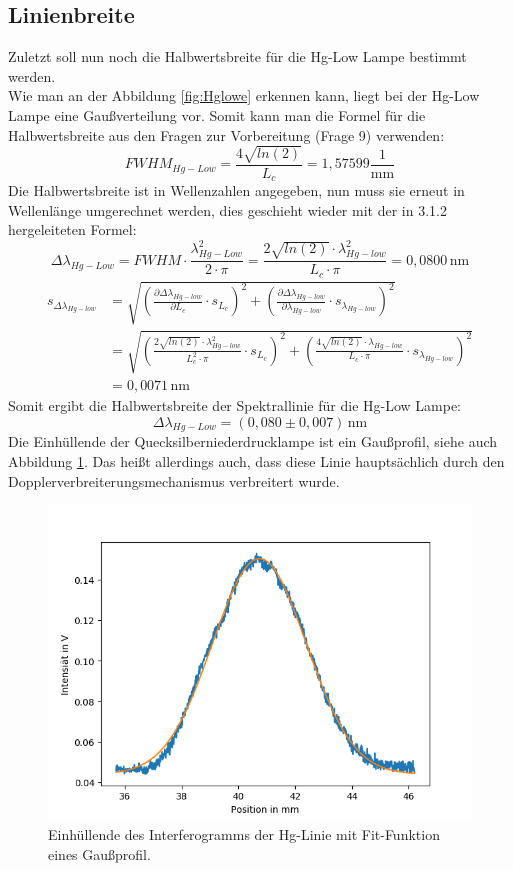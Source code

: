 \subsection{Linienbreite}
Zuletzt soll nun noch die Halbwertsbreite für die Hg-Low Lampe bestimmt werden.\\
Wie man an der Abbildung \ref{fig:Hglowe} erkennen kann, liegt bei der Hg-Low Lampe eine Gaußverteilung vor. 
Somit kann man die Formel für die Halbwertsbreite aus den Fragen zur Vorbereitung (Frage 9) verwenden:
\begin{equation}
    FWHM_{Hg-Low} = \frac{4 \sqrt{ln(2)}}{L_c} = 1,57599 \frac{1}{\text{mm}}
\end{equation}
Die Halbwertsbreite ist in Wellenzahlen angegeben, nun muss sie erneut in Wellenlänge umgerechnet werden, dies 
geschieht wieder mit der in 3.1.2 hergeleiteten Formel:
\begin{equation}
    \Delta \lambda_{Hg-Low} = FWHM \cdot \frac{\lambda^2_{Hg-Low}}{2 \cdot \pi} = \frac{2 \sqrt{ln(2)} \cdot \lambda^2_{Hg-low}}{L_c \cdot \pi} = 0,0800\,\text{nm}
\end{equation}
\begin{align}
    s_{\Delta \lambda_{Hg-low}} &= \sqrt{\left(\frac{\partial \Delta \lambda_{Hg-low}}{\partial L_c} \cdot s_{L_c}\right)^2+\left(\frac{\partial \Delta \lambda_{Hg-low}}{\partial \lambda_{Hg-low}} \cdot s_{\lambda_{Hg-low}}\right)^2} \\
    &= \sqrt{\left(\frac{2 \sqrt{ln(2)} \cdot \lambda^2_{Hg-low}}{L_c^2 \cdot \pi} \cdot s_{L_c}\right)^2+\left(\frac{4 \sqrt{ln(2)}\cdot \lambda_{Hg-low}}{L_c \cdot \pi} \cdot s_{\lambda_{Hg-low}}\right)^2} \\
    & = 0,0071\,\text{nm}
\end{align}
Somit ergibt die Halbwertsbreite der Spektrallinie für die Hg-Low Lampe:
\begin{equation}
    \Delta \lambda_{Hg-Low} = (0,080 \pm 0,007)\,\text{nm}
\end{equation}
Die Einhüllende der Quecksilberniederdrucklampe ist ein Gaußprofil, siehe auch Abbildung \ref{fig:gaussfit}. Das 
heißt allerdings auch, dass diese Linie hauptsächlich durch den Dopplerverbreiterungsmechanismus verbreitert wurde.
\begin{figure}[h]
    \centering
    \includegraphics[scale=0.65]{Bilder/Anna/gauss.png}
    \caption{Einhüllende des Interferogramms der Hg-Linie mit Fit-Funktion eines Gaußprofil.}
    \label{fig:gaussfit}
\end{figure}
